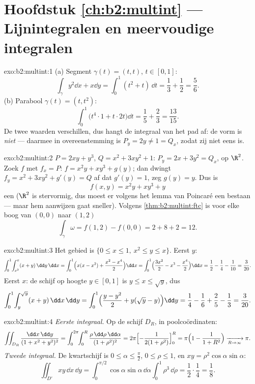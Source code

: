 \section*{Hoofdstuk \ref{ch:b2:multint} --- Lijnintegralen en meervoudige integralen}

\begin{solution}{exo:b2:multint:1}
(a) Segment $\gamma(t) = (t, t)$, $t \in [0,1]$:
\[
\int_\gamma y^2\dd x + x\dd y
= \int_0^1 (t^2 + t)\,\dd t = \frac13 + \frac12 = \frac56 .
\]
(b) Parabool $\gamma(t) = (t, t^2)$:
\[
\int_0^1 \bigl(t^4\cdot 1 + t\cdot 2t\bigr)\dd t
= \frac15 + \frac23 = \frac{13}{15} .
\]
De twee waarden verschillen, dus hangt de integraal van het pad af:
de vorm is \emph{niet}  --- daarmee in overeenstemming is $P_y
= 2y \neq 1 = Q_x$, zodat zij niet eens  is.
\end{solution}

\begin{solution}{exo:b2:multint:2}
$P = 2xy + y^3$, $Q = x^2 + 3xy^2 + 1$: $P_y = 2x + 3y^2 = Q_x$,
 op $\R^2$. Zoek $f$ met $f_x = P$: $f = x^2y + xy^3 +
g(y)$; dan dwingt $f_y = x^2 + 3xy^2 + g'(y) = Q$ af dat $g'(y) =
1$, zeg $g(y) = y$. Dus is
\[
f(x, y) = x^2y + xy^3 + y
\]
een  ($\R^2$ is stervormig, dus moest er volgens het
lemma van Poincaré een  bestaan --- maar hem aanwijzen
gaat sneller). Volgens \cref{thm:b2:multint:ftc} is voor elke boog
van $(0,0)$ naar $(1,2)$
\[
\int_\gamma\omega = f(1, 2) - f(0, 0) = 2 + 8 + 2 = 12 .
\]
\end{solution}

\begin{solution}{exo:b2:multint:3}
Het gebied is $\{0 \leq x \leq 1,\ x^2 \leq y \leq x\}$. Eerst
$y$:
\[
\int_0^1\!\int_{x^2}^{x}(x + y)\,\dd y\,\dd x
= \int_0^1\Bigl(x(x - x^2)
+ \frac{x^2 - x^4}{2}\Bigr)\dd x
= \int_0^1\Bigl(\frac{3x^2}{2} - x^3 - \frac{x^4}{2}\Bigr)\dd x
= \frac12 - \frac14 - \frac1{10} = \frac{3}{20} .
\]
Eerst $x$: de schijf op hoogte $y \in [0, 1]$ is $y \leq x \leq
\sqrt y$, dus
\[
\int_0^1\!\int_{y}^{\sqrt y}(x + y)\,\dd x\,\dd y
= \int_0^1\Bigl(\frac{y - y^2}{2}
+ y(\sqrt y - y)\Bigr)\dd y
= \frac14 - \frac16 + \frac25 - \frac13 = \frac{3}{20} .
\]
\end{solution}

\begin{solution}{exo:b2:multint:4}
\emph{Eerste integraal.} Op de schijf $D_R$, in poolcoördinaten:
\[
\iint_{D_R}\frac{\dd x\,\dd y}{(1 + x^2 + y^2)^2}
= \int_0^{2\pi}\!\!\int_0^R
\frac{\rho\,\dd\rho\,\dd\alpha}{(1 + \rho^2)^2}
= 2\pi\Bigl[-\frac{1}{2(1 + \rho^2)}\Bigr]_0^R
= \pi\Bigl(1 - \frac{1}{1 + R^2}\Bigr)
\xrightarrow[R \to \infty]{} \pi .
\]
\emph{Tweede integraal.} De kwartschijf is $0 \leq \alpha \leq
\frac\pi2$, $0 \leq \rho \leq 1$, en $xy =
\rho^2\cos\alpha\sin\alpha$:
\[
\iint_{D'}xy\,\dd x\,\dd y
= \int_0^{\pi/2}\!\!\cos\alpha\sin\alpha\,\dd\alpha
\int_0^1 \rho^3\,\dd\rho
= \frac12\cdot\frac14 = \frac18 .
\]
\end{solution}

